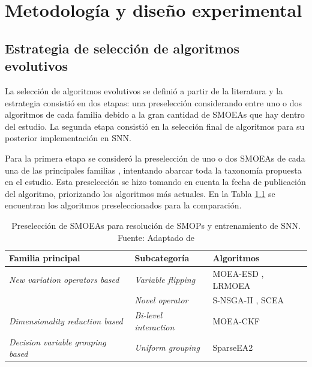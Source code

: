 \chapter{Metodología y diseño experimental}


\section{Estrategia de selección de algoritmos evolutivos}

La selección de algoritmos evolutivos se definió a partir de la literatura \cite{Shao2025_SMOEA} y la estrategia consistió en dos etapas: una preselección considerando entre uno o dos algoritmos de cada familia debido a la gran cantidad de SMOEAs que hay dentro del estudio. La segunda etapa consistió en la selección final de algoritmos para su posterior implementación en SNN.

Para la primera etapa se consideró la preselección de uno o dos SMOEAs de cada una de las principales familias \cite{Shao2025_SMOEA}, intentando abarcar toda la taxonomía propuesta en el estudio. Esta preselección se hizo tomando en cuenta la fecha de publicación del algoritmo, priorizando los algoritmos más actuales. En la Tabla \ref{tab:preseleccion_algoritmos} se encuentran los algoritmos preseleccionados para la comparación.

\begin{table}
    \centering
    \small
    \caption{Preselección de SMOEAs para resolución de SMOPs y entrenamiento de SNN. Fuente: Adaptado de \cite{Shao2025_SMOEA}}
    \label{tab:preseleccion_algoritmos}
    \begin{tabular}{p{5.5cm}lp{5cm}}\hline
         \textbf{Familia principal}&  \textbf{Subcategoría}& \textbf{Algoritmos}\\\hline
         \textit{New variation operators based}&  \textit{Variable flipping}& MOEA-ESD \cite{Ren2023MultipleSD_MOEA_ESD}, LRMOEA \cite{10612838_LRMOEA}\\
         &  \textit{Novel operator}& S-NSGA-II \cite{10066873_S-NSGA-II}, SCEA \cite{ZHANG2024108194_SCEA}\\
         \textit{Dimensionality reduction based}&  \textit{Bi-level interaction}& MOEA-CKF \cite{10664523_MOEA-CKF}\\
         \textit{Decision variable grouping based}&  \textit{Uniform grouping}& SparseEA2 \cite{SparseEA2}\\ \hline
    \end{tabular}
\end{table}

